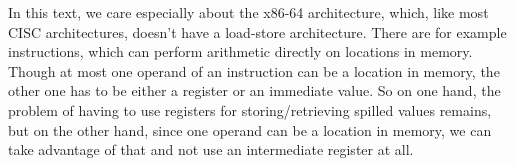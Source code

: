 %


In this text, we care especially about the x86-64 architecture, which, like most
CISC architectures, doesn't have a load-store architecture. There are
for example instructions, which can perform arithmetic directly on locations in memory.
Though at most one operand of an instruction can be a location in memory, the
other one has to be either a register or an immediate value. So on one hand, the
problem of having to use registers for storing/retrieving spilled values
remains, but on the other hand, since one operand can be a location in memory,
we can take advantage of that and not use an intermediate register at all.

